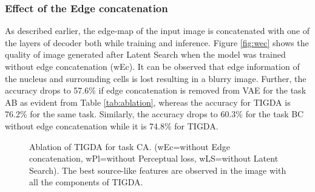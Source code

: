 \documentclass[journal,twoside,web]{IEEEtran}
\renewcommand{\textrightarrow}{}
\begin{document}
\subsubsection{Effect of the Edge concatenation}
As described earlier, the edge-map of the input image is concatenated with one of the layers of decoder both while training and inference. Figure \ref{fig:wec} shows the quality of image generated after Latent Search when the model was trained without edge concatenation (wEc). It can be observed that edge information of the nucleus and surrounding cells is lost resulting in a blurry image. Further, the accuracy drops to 57.6\% if edge concatenation is removed from VAE for the task A\textrightarrow B as evident from Table \ref{tab:ablation}, whereas the accuracy for TIGDA is 76.2\% for the same task. Similarly, the accuracy drops to 60.3\% for the task B\textrightarrow C without edge concatenation while it is 74.8\% for TIGDA.
\setlength{\textfloatsep}{0pt}
\begin{figure}[hbt!]
\centering
{}
\caption{Ablation of TIGDA for task C\textrightarrow A. 
(wEc=without Edge concatenation, wPl=without Perceptual loss, wLS=without Latent Search). The best source-like features are observed in the image with all the components of TIGDA.}
\label{fig:ablation_imgs}
\end{figure}
\setlength{\textfloatsep}{0pt}
\end{document}
